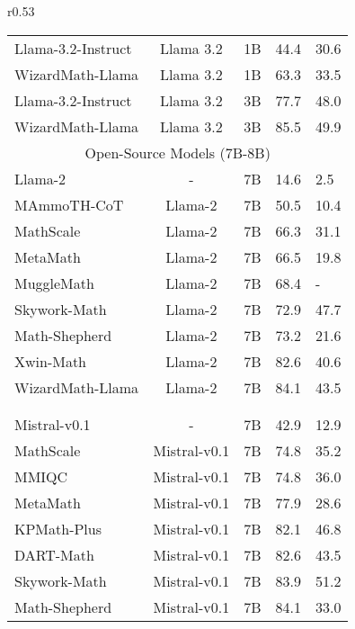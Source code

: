 \begin{wraptable}{r}{0.53\textwidth}
{\begin{tabular}{lccll}
    Llama-3.2-Instruct~\citep{dubey2024-llama3} & Llama 3.2 & 1B & 44.4 & 30.6 \\  
    \rowcolor{gray!30}
    WizardMath-Llama & Llama 3.2 & 1B & 63.3 & 33.5 \\  
    Llama-3.2-Instruct & Llama 3.2 & 3B & 77.7 & 48.0 \\ 
    \rowcolor{gray!30}
    WizardMath-Llama & Llama 3.2 & 3B & 85.5 & 49.9 \\  
    \midrule
    \multicolumn{5}{c}{Open-Source Models (7B-8B)}\\
    \midrule   
    Llama-2~\citep{touvron2023llama2} & - & 7B & 14.6 & 2.5 \\  
    MAmmoTH-CoT~\citep{yue2023mammoth} & Llama-2 & 7B & 50.5 & 10.4 \\  
    MathScale~\citep{tang2024mathscale} & Llama-2 & 7B & 66.3 & 31.1 \\  
    MetaMath~\citep{yu2023metamath} & Llama-2 & 7B & 66.5 & 19.8 \\  
    MuggleMath~\citep{Li2023mugglemath} & Llama-2 & 7B & 68.4 & - \\  
    Skywork-Math~\citep{zeng2024-skywork-math} & Llama-2 & 7B & 72.9 & 47.7 \\  
    Math-Shepherd~\citep{wang2024-mathshepherd} & Llama-2 & 7B & 73.2 & 21.6 \\  
    Xwin-Math~\citep{li2024-Xwin-math} & Llama-2 & 7B & 82.6 & 40.6 \\ 
    \rowcolor{gray!30}
    WizardMath-Llama & Llama-2 & 7B & 84.1 & 43.5 \\ \\[-0.7em]  \hdashline \\[-0.7em]
    Mistral-v0.1~\citep{jiang2023mistral} & - & 7B & 42.9 & 12.9 \\  
    MathScale~\citep{tang2024mathscale} & Mistral-v0.1 & 7B & 74.8 & 35.2 \\  
    MMIQC~\citep{liu2024-MMIQC} & Mistral-v0.1 & 7B & 74.8 & 36.0 \\  
    MetaMath~\citep{yu2023metamath} & Mistral-v0.1 & 7B & 77.9 & 28.6 \\  
    KPMath-Plus~\citep{huang2024-KPMath} & Mistral-v0.1 & 7B & 82.1 & 46.8 \\  
    DART-Math~\citep{tong2024-DART} & Mistral-v0.1 & 7B & 82.6 & 43.5 \\  
    Skywork-Math~\citep{zeng2024-skywork-math} & Mistral-v0.1 & 7B & 83.9 & 51.2 \\  
    Math-Shepherd~\citep{wang2024-mathshepherd} & Mistral-v0.1 & 7B & 84.1 & 33.0 \\  

\end{tabular}}
\end{wraptable}
